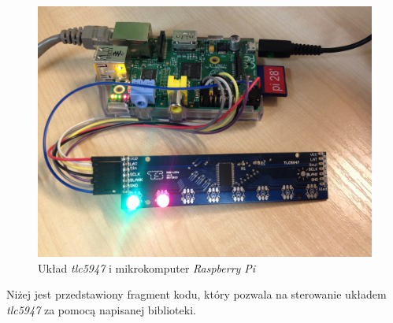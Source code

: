 \documentclass[eng,printmode]{mgr}
\begin{document}
\begin{figure}[!ht]
    \centering
    \includegraphics[width=\textwidth]{Figures/rpi_tlc.jpg} 
    \caption{Układ \emph{tlc5947} i mikrokomputer \emph{Raspberry Pi}}
    \label{fig:rpi_tlc}
\end{figure}

\clearpage

Niżej jest przedstawiony fragment kodu, który pozwala na sterowanie układem \emph{tlc5947} za pomocą napisanej biblioteki.
\end{document}
